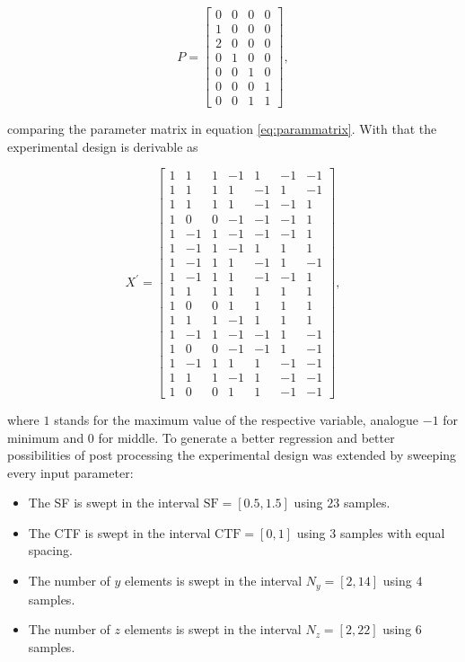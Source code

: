\begin{equation}
P = \begin{bmatrix}
0 & 0 & 0 & 0\\
1 & 0 & 0 & 0\\
2 & 0 & 0 & 0\\
0 & 1 & 0 & 0\\
0 & 0 & 1 & 0\\
0 & 0 & 0 & 1\\
0 & 0 & 1 & 1
\end{bmatrix},
\end{equation}

comparing the parameter matrix in equation \ref{eq:parammatrix}. With that the experimental design is derivable as 

\begin{equation}
X^\prime = \begin{bmatrix}
1&1&1&-1&1&-1&-1\\
1&1&1&1&-1&1&-1\\
1&1&1&1&-1&-1&1\\
1&0&0&-1&-1&-1&1\\
1&-1&1&-1&-1&-1&1\\
1&-1&1&-1&1&1&1\\
1&-1&1&1&-1&1&-1\\
1&-1&1&1&-1&-1&1\\
1&1&1&1&1&1&1\\
1&0&0&1&1&1&1\\
1&1&1&-1&1&1&1\\
1&-1&1&-1&-1&1&-1\\
1&0&0&-1&-1&1&-1\\
1&-1&1&1&1&-1&-1\\
1&1&1&-1&1&-1&-1\\
1&0&0&1&1&-1&-1
\end{bmatrix},
\end{equation}

where $1$ stands for the maximum value of the respective variable, analogue $-1$ for minimum and $0$ for middle. To generate a better regression and better possibilities of post processing the experimental design was extended by sweeping every input parameter:

\begin{itemize}
\item The \ac{SF} is swept in the interval $\text{SF}=\left[0.5,1.5\right]$ using $23$ samples.
\item The \ac{CTF} is swept in the interval $\text{CTF}=\left[0,1\right]$ using $3$ samples with equal spacing.
\item The number of $y$ elements is swept in the interval $N_y=\left[2,14\right]$ using $4$ samples.
\item The number of $z$ elements is swept in the interval $N_z=\left[2,22\right]$ using $6$ samples.
\end{itemize}

